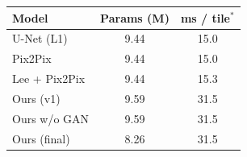 \begin{tabular}{lcc}
\toprule
Model & Params (M) & ms / tile$^\ast$ \\
\midrule
U-Net (L1) & 9.44 & 15.0 \\
Pix2Pix & 9.44 & 15.0 \\
Lee + Pix2Pix & 9.44 & 15.3 \\
Ours (v1) & 9.59 & 31.5 \\
Ours w/o GAN & 9.59 & 31.5 \\
Ours (final) & 8.26 & 31.5 \\
\bottomrule
\end{tabular}